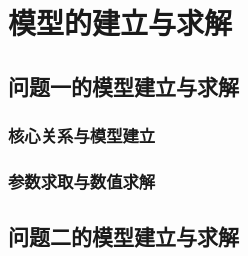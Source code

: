 \section{模型的建立与求解}


\subsection{问题一的模型建立与求解}

\subsubsection{核心关系与模型建立}


\subsubsection{参数求取与数值求解}


\subsection{问题二的模型建立与求解}

